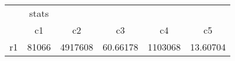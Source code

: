 \begin{tabular}{l*{5}{c}}
\hline\hline
            &       stats&            &            &            &            \\
            &          c1&          c2&          c3&          c4&          c5\\
\hline
r1          &       81066&     4917608&    60.66178&     1103068&    13.60704\\
\hline\hline
\end{tabular}
